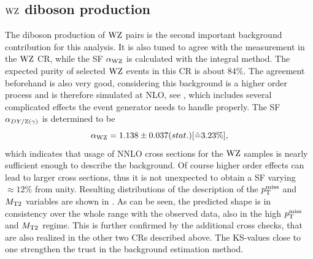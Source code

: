 \subsection{$\mathrm{W}\mathrm{Z}$ diboson production}
The diboson production of $\mathrm{W}\mathrm{Z}$ pairs is the second important background contribution for this analysis. It is also tuned to agree with the measurement in the $\mathrm{W}\mathrm{Z}$ CR, while the SF $\alpha_{\mathrm{W}\mathrm{Z}}$ is calculated with the integral method. The expected purity of selected $\mathrm{W}\mathrm{Z}$ events in this CR is about $84\%$.
The agreement beforehand is also very good, considering this background is a higher order process and is therefore simulated at NLO, see , which includes several complicated effects the event generator needs to handle properly. The SF $\alpha_{DY/\mathrm{Z}(\gamma)}$ is determined to be
\begin{equation}\label{eq:AlphaWZ}
 \alpha_{\mathrm{W}\mathrm{Z}}=1.138 \pm 0.037 (stat.) [\hat{=}3.23\%],
\end{equation}
which indicates that usage of NNLO cross sections for the $\mathrm{W}\mathrm{Z}$ samples is nearly sufficient enough to describe the background. Of course higher order effects can lead to larger cross sections, thus it is not unexpected to obtain a SF varying $\approx12\%$ from unity. Resulting distributions of the description of the $p_{\mathrm{T}}^\text{miss}$ and $M_{\mathrm{T2}}$ variables are shown in . As can be seen, the predicted shape is in consistency over the whole range with the observed data, also in the high $p_{\mathrm{T}}^\text{miss}$ and $M_{\mathrm{T2}}$ regime. This is further confirmed by the additional cross checks, that are also realized in the other two CRs described above. The KS-values close to one strengthen the trust in the background estimation method.

